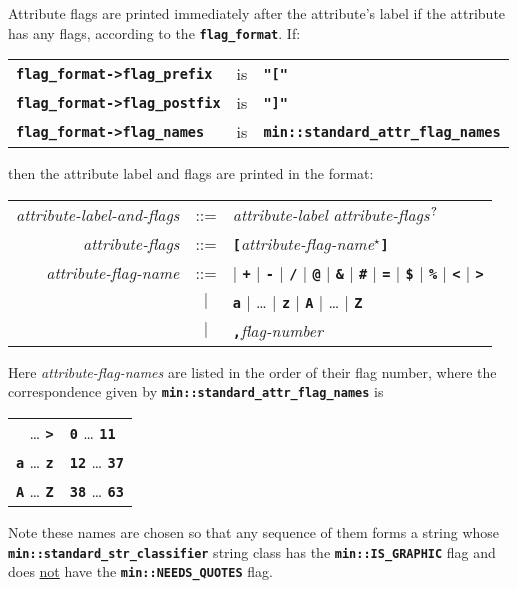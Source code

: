 \documentclass[12pt]{article}
\newcommand{\TT}[1]{{\tt \bfseries #1}}
\newcommand{\QMARK}{{$^{\,\mbox{\footnotesize ?}}$}}
\newcommand{\EOL}{\penalty \exhyphenpenalty}
\begin{document}
Attribute flags\label{ATTRIBUTE-FLAG-NAMES}
are printed immediately after the attribute's label
if the attribute has any flags, according to the \TT{flag\_\EOL format}.
If:
\begin{center}
\begin{tabular}{lcl}
\TT{flag\_format->flag\_prefix}		& is	& \TT{"["} \\
\TT{flag\_format->flag\_postfix}	& is	& \TT{"]"} \\
\TT{flag\_format->flag\_names}		& is
			    & \TT{min::standard\_attr\_flag\_names} \\
\end{tabular}
\end{center}

then the attribute label and flags are printed in the format:

\newcommand{\TTBS}[1]{\TT{\textbackslash#1}}
\begin{center}
\begin{tabular}{rcl}
{\em attribute-label-and-flags} & ::= & {\em attribute-label}
                                        {\em attribute-flags}\QMARK{} \\
{\em attribute-flags}
    & ::= & \TT{[}{\em attribute-flag-name}$^\star$\TT{]} \\
{\em attribute-flag-name} & ::= &
        \TT{*} $|$ \TT{+} $|$ \TT{-} $|$ \TT{/} $|$ \TT{@}
    $|$ \TT{\&} $|$ \TT{\#} $|$ \TT{=} $|$ \TT{\$}
    $|$ \TT{\%} $|$ \TT{<} $|$ \TT{>} \\
& $|$ & \TT{a} $|$ \ldots{} $|$ \TT{z} $|$ \TT{A} $|$ \ldots{} $|$ \TT{Z} \\
& $|$ & \TT{,}{\em flag-number}
\end{tabular}
\end{center}

Here {\em attribute-flag-names} are listed in the order of their flag number,
where the correspondence given
by \TT{min::\EOL standard\_\EOL attr\_\EOL flag\_\EOL names} is
\begin{center}
\begin{tabular}{r@{~correspond to flag numbers~}l}
\TT{*} \ldots{} \TT{>} & \TT{0} \ldots{} \TT{11} \\
\TT{a} \ldots{} \TT{z} & \TT{12} \ldots{} \TT{37} \\
\TT{A} \ldots{} \TT{Z} & \TT{38} \ldots{} \TT{63} \\
\end{tabular}
\end{center}

Note these names are chosen so that any sequence of them forms
a string whose \TT{min::stan\-dard\_\EOL str\_\EOL classifier} string
class has the \TT{min::\EOL IS\_\EOL GRAPHIC} flag and does
\underline{not} have the \TT{min::\EOL NEEDS\_\EOL QUOTES} flag.
\end{document}
